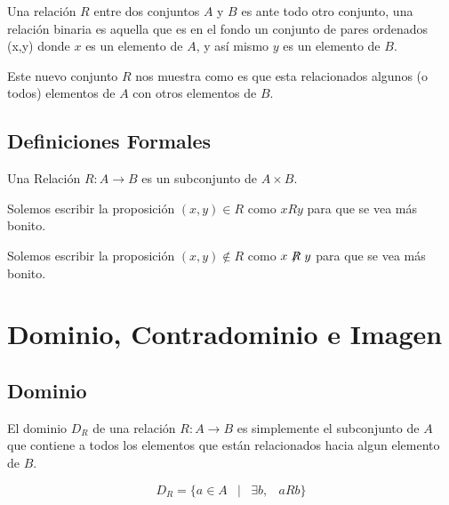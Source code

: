 \documentclass[12pt]{report}                                    %
\DeclareMathOperator \Space {\quad}                             %
\DeclareMathOperator \MiniSpace {\;}                            %
\newcommand \Such {\MiniSpace|\MiniSpace}                       %
\begin{document}
            Una relación $R$ entre dos conjuntos $A$ y $B$ es ante todo otro conjunto, una relación binaria es aquella
            que es en el fondo un conjunto de pares ordenados (x,y) donde $x$ es un elemento de $A$, y así mismo
            $y$ es un elemento de $B$.

            Este nuevo conjunto $R$ nos muestra como es que esta relacionados algunos (o todos) elementos de $A$ con
            otros elementos de $B$.



            \subsection*{Definiciones Formales}

                Una Relación $R: A \to B$ es un subconjunto de $A \times B$.

                Solemos escribir la proposición $(x, y) \in R$ como $x R y$ para que se vea más bonito.

                Solemos escribir la proposición $(x, y) \notin R$ como $x\centernot{R}y$ para que se vea más bonito.





        \clearpage
        \section{Dominio, Contradominio e Imagen}
                
            \subsection*{Dominio}

                El dominio $D_R$ de una relación $R : A \to B$ es simplemente el subconjunto de $A$ que
                contiene a todos los elementos que están relacionados hacia algun elemento de $B$.

                \begin{equation}
                    D_R = \{ a \in A \Such \exists b, \MiniSpace aRb \}
                \end{equation}
\end{document}
